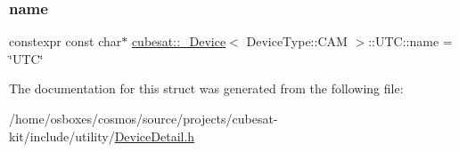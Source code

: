 \subsubsection{\texorpdfstring{name}{name}}
{\footnotesize\ttfamily constexpr const char$\ast$ \hyperlink{structcubesat_1_1__Device}{cubesat\+::\+\_\+\+Device}$<$ Device\+Type\+::\+C\+AM $>$\+::U\+T\+C\+::name = \char`\"{}U\+TC\char`\"{}\hspace{0.3cm}{\ttfamily [static]}}



The documentation for this struct was generated from the following file\+:\begin{DoxyCompactItemize}
\item 
/home/osboxes/cosmos/source/projects/cubesat-\/kit/include/utility/\hyperlink{DeviceDetail_8h}{Device\+Detail.\+h}\end{DoxyCompactItemize}
